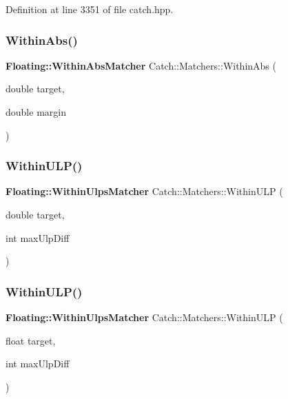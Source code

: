Definition at line 3351 of file catch.\+hpp.

\mbox{\label{namespace_catch_1_1_matchers_a4c9ea76d47d02de0cf2d354c87c26e95}} 
\subsubsection{WithinAbs()}
{\footnotesize\ttfamily \textbf{ Floating\+::\+Within\+Abs\+Matcher} Catch\+::\+Matchers\+::\+Within\+Abs (\begin{DoxyParamCaption}\item[{double}]{target,  }\item[{double}]{margin }\end{DoxyParamCaption})}

\mbox{\label{namespace_catch_1_1_matchers_ae895591bd78a7d0ce4cdf3cf40d89ab5}} 
\subsubsection{WithinULP()\hspace{0.1cm}{\footnotesize\ttfamily [1/2]}}
{\footnotesize\ttfamily \textbf{ Floating\+::\+Within\+Ulps\+Matcher} Catch\+::\+Matchers\+::\+Within\+U\+LP (\begin{DoxyParamCaption}\item[{double}]{target,  }\item[{int}]{max\+Ulp\+Diff }\end{DoxyParamCaption})}

\mbox{\label{namespace_catch_1_1_matchers_ab87ee77e5349fac450d1e631dee86496}} 
\subsubsection{WithinULP()\hspace{0.1cm}{\footnotesize\ttfamily [2/2]}}
{\footnotesize\ttfamily \textbf{ Floating\+::\+Within\+Ulps\+Matcher} Catch\+::\+Matchers\+::\+Within\+U\+LP (\begin{DoxyParamCaption}\item[{float}]{target,  }\item[{int}]{max\+Ulp\+Diff }\end{DoxyParamCaption})}

